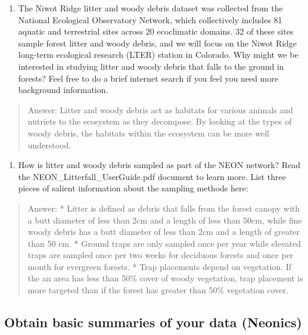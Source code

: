 \documentclass[]{article}
\providecommand{\tightlist}{%
  \setlength{\itemsep}{0pt}\setlength{\parskip}{0pt}}
\begin{document}
\begin{enumerate}
\def\labelenumi{\arabic{enumi}.}
\setcounter{enumi}{2}
\tightlist
\item
  The Niwot Ridge litter and woody debris dataset was collected from the
  National Ecological Observatory Network, which collectively includes
  81 aquatic and terrestrial sites across 20 ecoclimatic domains. 32 of
  these sites sample forest litter and woody debris, and we will focus
  on the Niwot Ridge long-term ecological research (LTER) station in
  Colorado. Why might we be interested in studying litter and woody
  debris that falls to the ground in forests? Feel free to do a brief
  internet search if you feel you need more background information.
\end{enumerate}

\begin{quote}
Answer: Litter and woody debris act as habitats for various animals and
nutriets to the ecosystem as they decompose. By looking at the types of
woody debris, the habitats within the ecosystem can be more well
understood.
\end{quote}

\begin{enumerate}
\def\labelenumi{\arabic{enumi}.}
\setcounter{enumi}{3}
\tightlist
\item
  How is litter and woody debris sampled as part of the NEON network?
  Read the NEON\_Litterfall\_UserGuide.pdf document to learn more. List
  three pieces of salient information about the sampling methods here:
\end{enumerate}

\begin{quote}
Answer: * Litter is defined as debris that falls from the forest canopy
with a butt diameter of less than 2cm and a length of less than 50cm,
while fine woody debris has a butt diameter of less than 2cm and a
length of greater than 50 cm. * Ground traps are only sampled once per
year while elevated traps are sampled once per two weeks for deciduous
forests and once per month for evergreen forests. * Trap placements
depend on vegetation. If the an area has less than 50\% cover of woody
vegetation, trap placement is more targeted than if the forest has
greater than 50\% vegetation cover.
\end{quote}

\hypertarget{obtain-basic-summaries-of-your-data-neonics}{%
\subsection{Obtain basic summaries of your data
(Neonics)}\label{obtain-basic-summaries-of-your-data-neonics}}
\end{document}
